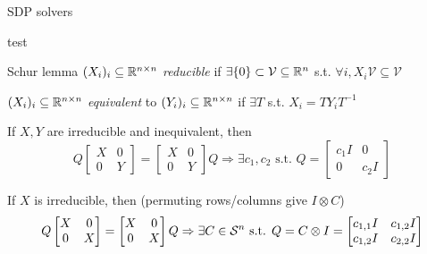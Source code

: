 \begin{frame}{SDP solvers}
  \begin{block}{test}
  \end{block}
\end{frame}

\begin{frame}{Schur lemma}
  \noindent$(X_i)_i\subseteq \mathbb{R}^{n \times n}$ \emph{reducible} if $\exists \{0\} \subset \mathcal{V} \subseteq \mathbb{R}^n$ s.t. $\forall i, X_i \mathcal{V} \subseteq \mathcal{V}$

  \noindent$(X_i)_i\subseteq \mathbb{R}^{n \times n}$ \emph{equivalent} to $(Y_i)_i\subseteq \mathbb{R}^{n \times n}$ if $\exists T$ s.t. $X_i = TY_iT^{-1}$

  If $X, Y$ are irreducible and inequivalent, then
  $$
  Q
  \begin{bmatrix}
    X & 0\\
    0 & Y
  \end{bmatrix}
    =
  \begin{bmatrix}
    X & 0\\
    0 & Y
  \end{bmatrix}
  Q
  \Rightarrow
  \exists c_1, c_2 \text{ s.t. }
  Q =
  \begin{bmatrix}
    c_1 I & 0\\
    0 & c_2 I
  \end{bmatrix}
  $$

  If $X$ is irreducible, then (permuting rows/columns give
  $I \otimes C$)
  $$
  Q
  \begin{bmatrix}
    X & 0\\
    0 & X
  \end{bmatrix}
    =
  \begin{bmatrix}
    X & 0\\
    0 & X
  \end{bmatrix}
  Q
  \Rightarrow
  \exists C \in \mathcal{S}^n \text{ s.t. }
  Q = C \otimes I =
  \begin{bmatrix}
    c_{1,1}I & c_{1,2}I\\
    c_{1,2}I & c_{2,2}I
  \end{bmatrix}
  $$

\end{frame}
